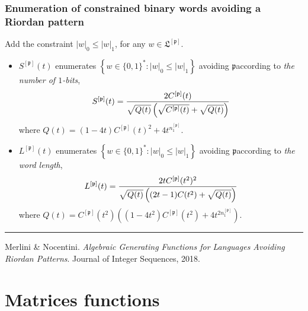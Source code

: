 \documentclass[9pt]{beamer}
\begin{document}
\begin{frame}[fragile]
\frametitle{Enumeration of constrained binary words avoiding a Riordan pattern}

Add the constraint $|w|_0\leq |w|_1$, for any $w\in \mathfrak{L}^{[\mathfrak{p}]}$.
\begin{itemize}
\item $S^{[\mathfrak{p}]}(t)$ enumerates $\left\lbrace w\in \lbrace 0,1 \rbrace^{*}:
|w|_0\leq |w|_1\right\rbrace$ avoiding $\mathfrak{p}$\newline according to
\textit{the number of $1$-bits},
$$S^{[\mathfrak{p}]}(t)={2C^{[\mathfrak{p}]}(t) \over \sqrt{Q(t)}\left(\sqrt{C^{[\mathfrak{p}]}(t)}+ \sqrt{Q(t)} \right)} $$
    where $Q(t)={(1-4t)C^{[\mathfrak{p}]}(t)^2+4t^{n_1^{[\mathfrak{p}]}}}.$
\item $L^{[\mathfrak{p}]}(t)$ enumerates $\left\lbrace w\in \lbrace 0,1 \rbrace^{*}:
|w|_0\leq |w|_1\right\rbrace$ avoiding $\mathfrak{p}$\newline according to
\textit{the word length},
$$L^{[\mathfrak{p}]}(t)= {2tC^{[\mathfrak{p}]}(t^2)^2 \over \sqrt{Q(t)}\left((2t-1)C(t^2)+ \sqrt{ Q(t) } \right)}$$
where $Q(t)=C^{[\mathfrak{p}]}(t^2)\left( (1-4t^2)C^{[\mathfrak{p}]}(t^2)+4t^{2n_1^{[\mathfrak{p}]}}\right).$
\end{itemize}
\vfill
\noindent\rule{\textwidth}{0.1pt}
{\footnotesize
Merlini \& Nocentini. \textit{Algebraic Generating Functions for Languages
Avoiding Riordan Patterns}.  Journal of Integer Sequences, 2018.}
\end{frame}


\section{Matrices functions}
\end{document}
